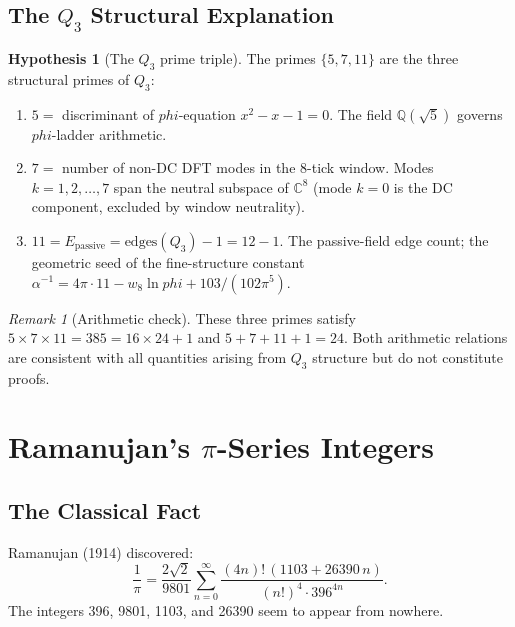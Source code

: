 \documentclass[11pt]{article}
\def\leanhyp{}
\def\phig{phi}
\theoremstyle{plain}
\theoremstyle{definition}
\newtheorem{hypothesis}[theorem]{Hypothesis}
\theoremstyle{remark}
\newtheorem{remark}[theorem]{Remark}
\newcommand{\leanhyp}{\textsuperscript{\textnormal{[\textsc{Hyp}]}}}
\newcommand{\C}{\mathbb{C}}
\newcommand{\QQ}{\mathbb{Q}}
\newcommand{\phig}{\varphi}
\begin{document}
\subsection[The Q3 Structural Explanation]{The $Q_3$ Structural Explanation}

\begin{hypothesis}[The $Q_3$ prime triple]\leanhyp\label{hyp:triple}
The primes $\{5, 7, 11\}$ are the three structural primes of $Q_3$:
\begin{enumerate}[label=(\roman*)]
\item $5 = $ discriminant of $\phig$-equation $x^2 - x - 1 = 0$.
      The field $\QQ(\sqrt{5})$ governs $\phig$-ladder arithmetic.
\item $7 = $ number of non-DC DFT modes in the 8-tick window.
      Modes $k = 1, 2, \ldots, 7$ span the neutral subspace of $\C^8$
      (mode $k = 0$ is the DC component, excluded by window neutrality).
\item $11 = E_{\mathrm{passive}} = \mathrm{edges}(Q_3) - 1 = 12 - 1$.
      The passive-field edge count; the geometric seed of the fine-structure
      constant $\alpha^{-1} = 4\pi \cdot 11 - w_8 \ln\phig + 103/(102\pi^5)$.
\end{enumerate}
\end{hypothesis}

\begin{remark}[Arithmetic check]
These three primes satisfy $5 \times 7 \times 11 = 385 = 16 \times 24 + 1$ and $5 + 7 + 11 + 1 = 24$.
Both arithmetic relations are consistent with all quantities arising from $Q_3$ structure but do not constitute proofs.
\end{remark}

\section[Ramanujan's pi-Series Integers]{Ramanujan's $\pi$-Series Integers}
\label{sec:pi}

\subsection{The Classical Fact}

Ramanujan (1914) discovered:
\begin{equation}\label{eq:ramanujan-pi}
  \frac{1}{\pi} = \frac{2\sqrt{2}}{9801}
  \sum_{n=0}^{\infty}
  \frac{(4n)!\,(1103 + 26390\,n)}{(n!)^4 \cdot 396^{4n}}.
\end{equation}
The integers 396, 9801, 1103, and 26390 seem to appear from nowhere.
\end{document}

